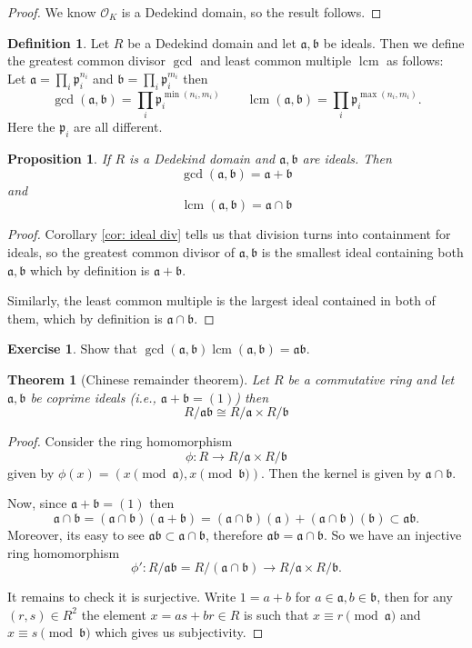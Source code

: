 \documentclass[11pt,a4paper]{report}
\theoremstyle{plain}
\newtheorem{thm}[subsection]{Theorem}
\newtheorem{prop}[subsection]{Proposition}
\theoremstyle{definition}
\newtheorem{defn}[subsection]{Definition}
\theoremstyle{definition}
\newtheorem{question}[subsection]{Exercise}
\def\gothb{\mathfrak{b}}
\def\gothp{\mathfrak{p}}
\def \OO {\mathcal{O}}
\def\gotha{\mathfrak{a}}
\DeclareMathOperator{\lcm}{lcm}
\def \lra{\longrightarrow}
\begin{document}
\begin{proof}
We know $\OO_K$ is a Dedekind domain, so the result follows.
\end{proof}

\begin{defn}\label{defn: ideal gcd and lcm}
Let $R$ be a Dedekind domain and let $\gotha,\gothb$ be ideals. Then we define the greatest common divisor $\gcd$ and least common multiple $\lcm$ as follows: Let $\gotha=\prod_i \gothp_i^{n_i}$ and  $\gothb=\prod_i \gothp_i^{m_i}$ then
\[\gcd(\gotha,\gothb)=\prod_i \gothp_i^{\min(n_i,m_i)} \qquad \lcm(\gotha,\gothb)=\prod_i \gothp_i^{\max(n_i,m_i)}.\]	Here the $\gothp_i$ are all different.

\end{defn}

\begin{prop}\label{prop: ideal gcd and lcm}
If $R$ is a Dedekind domain and $\gotha,\gothb$ are ideals. Then	\[\gcd(\gotha,\gothb)=\gotha+\gothb\] and \[\lcm(\gotha,\gothb)=\gotha \cap \gothb\]
\end{prop}

\begin{proof}
Corollary \ref{cor: ideal div} tells us that division turns into containment for ideals, so the greatest common divisor of $\gotha,\gothb$ is the smallest ideal containing both $\gotha,\gothb$ which by definition is $\gotha+\gothb$. 

Similarly, the least common multiple is the largest ideal contained in both of them, which by definition is $\gotha \cap \gothb$.
\end{proof}

\begin{question}\label{ques: ideal gcd lcm}
Show that $\gcd(\gotha,\gothb)\lcm(\gotha,\gothb)=\gotha\gothb$.
\end{question}


\begin{thm}[Chinese remainder theorem]\label{thm: chinese rem thm} Let $R$ be a commutative ring and let $\gotha,\gothb$ be coprime ideals (i.e., $\gotha+\gothb=(1)$) then \[R/\gotha\gothb \cong R/\gotha \times R/\gothb\]
\end{thm}

\begin{proof}
Consider the ring homomorphism \[\phi: R \to R/\gotha \times R/\gothb\] given by $\phi(x)=(x \pmod \gotha, x \pmod \gothb)$. Then the kernel is given by $\gotha \cap \gothb$.

Now, since $\gotha+\gothb=(1)$ then \[\gotha \cap \gothb =(\gotha \cap \gothb)(\gotha+\gothb)=(\gotha \cap \gothb)(\gotha)+(\gotha \cap \gothb)(\gothb) \subset \gotha \gothb.\] Moreover, its easy to see $\gotha\gothb \subset \gotha \cap \gothb$, therefore $\gotha\gothb=\gotha \cap \gothb$. So we have an injective ring homomorphism \[\phi':R/ \gotha\gothb=R/(\gotha\cap \gothb) \lra R/\gotha \times R/\gothb.\]

It remains to check it is surjective. Write $1=a+b$ for $a \in \gotha,b \in \gothb$, then for any $(r,s) \in R^2$ the element $x=as+br \in R$ is such that $x \equiv r \pmod \gotha$ and $x \equiv s \pmod \gothb$ which gives us subjectivity.
\end{proof}
\end{document}
